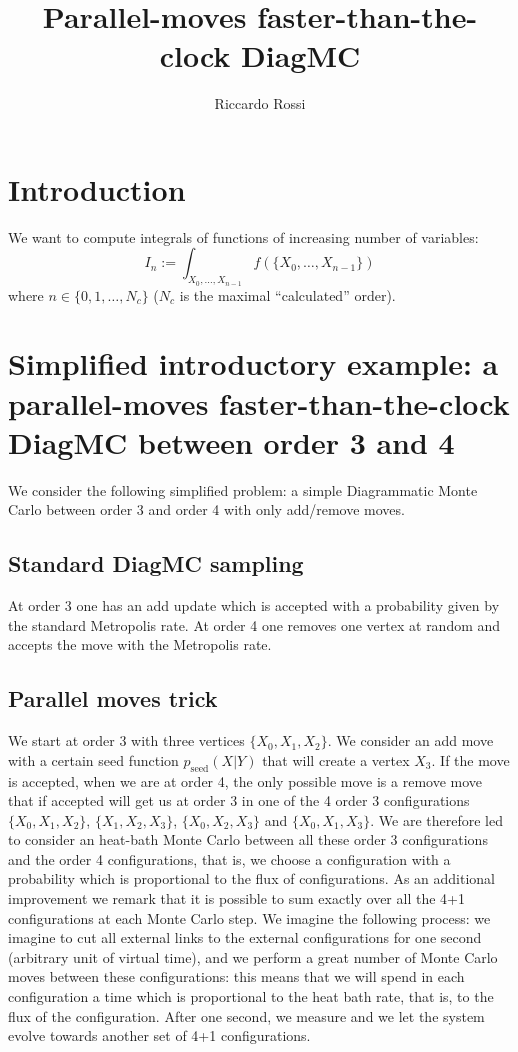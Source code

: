\documentclass{article}
\title{Parallel-moves faster-than-the-clock DiagMC}
\begin{document}
\author{Riccardo Rossi}
\maketitle
\section{Introduction}
We want to compute integrals of functions of increasing number of variables:
$$
I_n := \int_{X_0,\dots,X_{n-1}} f(\{X_0,\dots,X_{n-1}\})
$$
where $n\in \{0,1,\dots, N_c\}$ ($N_c$ is the maximal ``calculated'' order).
\section{Simplified introductory example: a parallel-moves faster-than-the-clock DiagMC between order 3 and 4}
We consider the following simplified problem: a simple Diagrammatic Monte Carlo between order 3 and order 4 with only add/remove moves. 
\subsection{Standard DiagMC sampling}
At order 3 one has an add update which is accepted with a probability given by the standard Metropolis rate. At order 4 one removes one vertex at random and accepts the move with the Metropolis rate.
\subsection{Parallel moves trick}
We start at order 3 with three vertices $\{X_0, X_1, X_2\}$. We consider an add move with a certain seed function $p_{\text{seed}}(X|Y)$ that will create a vertex $X_3$. If the move is accepted, when we are at order 4, the only possible move is a remove move that if accepted will get us at order 3 in one of the 4 order 3 configurations $\{X_0,X_1,X_2\}$, $\{X_1,X_2,X_3\}$, $\{X_0, X_2, X_3\}$ and $\{X_0, X_1, X_3\}$. We are therefore led to consider an heat-bath Monte Carlo between all these order 3 configurations and the order 4 configurations, that is, we choose a configuration with a probability which is proportional to the flux of configurations. As an additional improvement we remark that it is possible to sum exactly over all the 4+1 configurations at each Monte Carlo step. We imagine the following process: we imagine to cut all external links to the external configurations for one second (arbitrary unit of virtual time), and we perform a great number of Monte Carlo moves between these configurations: this means that we will spend in each configuration a time which is proportional to the heat bath rate, that is, to the flux of the configuration. After one second, we measure and we let the system evolve towards another set of 4+1 configurations.
\end{document}
